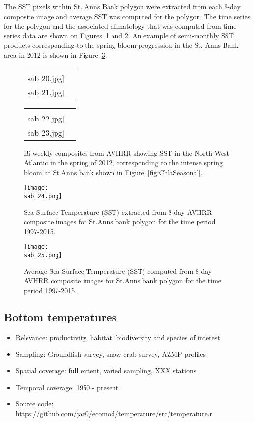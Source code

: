 \documentclass[letterpaper,portrait,11pt]{scrartcl}
\numberwithin{equation}{section}		%
\numberwithin{figure}{section}			%
\numberwithin{table}{section}				%
\newcommand{\ecomod}{\string~/ecomod_data/}   %
\newcommand{\sab}{\ecomod/mpa/sab/}   %
\begin{document}
The SST pixels within St. Anns Bank polygon were extracted from each 8-day composite image and average SST was computed for the polygon. The time series for the polygon and the associated climatology that was computed from time series data are shown on Figures~\ref{fig:SSTfromAVHRRmap} and \ref{fig:SSTfromAVHRRts}. An example of semi-monthly SST products corresponding to the spring bloom progression in the St. Anns Bank area in 2012 is shown in Figure~\ref{fig:SstSeasonal}.

\begin{figure}[h]
  \label{fig:SSTfromAVHRRmap}
  \centering
  \begin{tabular}{cc}
    \texttt{[image: \\sab 20.jpg]}
    \texttt{[image: \\sab 21.jpg]} 
  \end{tabular}
  \begin{tabular}{cc}
    \texttt{[image: \\sab 22.jpg]}
    \texttt{[image: \\sab 23.jpg]}
  \end{tabular}
  \caption{Bi-weekly composites from AVHRR showing SST in the North West Atlantic in the spring of 2012, corresponding to the intense spring bloom at St.Anns bank shown in Figure~\ref{fig:ChlaSeasonal}.}
\end{figure}

\begin{figure}[h]
  \label{fig:SSTfromAVHRRts}
  \centering
  \texttt{[image: \\sab 24.png]}
  \caption{Sea Surface Temperature (SST) extracted from 8-day AVHRR composite images for St.Anns bank polygon for the time period 1997-2015.}
\end{figure}

\begin{figure}[h]
  \label{fig:SstSeasonal}
  \centering
  \texttt{[image: \\sab 25.png]}
  \caption{Average Sea Surface Temperature (SST) computed from 8-day AVHRR composite images for St.Anns bank polygon for the time period 1997-2015.}
\end{figure}

\clearpage


\subsection{Bottom temperatures}

\begin{itemize}
  \item Relevance:  productivity, habitat, biodiversity and species of interest
  \item Sampling:  Groundfish survey, snow crab survey, AZMP profiles 
  \item Spatial coverage: full extent, varied sampling, XXX stations
  \item Temporal coverage: 1950 - present
  \item Source code: https://github.com/jae0/ecomod/temperature/src/temperature.r
\end{itemize}
\end{document}
